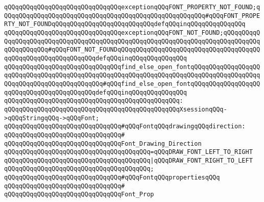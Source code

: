 \verb|qQQqqQQqqQQqqQQqqQQqqQQqqQQqqQQqexceptionqQQqFONT_PROPERTY_NOT_FOUND;qQQqqQQqqQQqqQQqqQQqqQQqqQQqqQQqqQQqqQQqqQQqqQQqqQQqqQQq#qQQqFONT_PROPERTY_NOT_FOUNDqQQqqQQqqQQqqQQqqQQqqQQqqQQqdefqQQqinqQQqqQQqqQQqqQQq|\newline
\verb|qQQqqQQqqQQqqQQqqQQqqQQqqQQqqQQqexceptionqQQqFONT_NOT_FOUND;qQQqqQQqqQQqqQQqqQQqqQQqqQQqqQQqqQQqqQQqqQQqqQQqqQQqqQQqqQQqqQQqqQQqqQQqqQQqqQQqqQQqqQQqqQQq#qQQqFONT_NOT_FOUNDqQQqqQQqqQQqqQQqqQQqqQQqqQQqqQQqqQQqqQQqqQQqqQQqqQQqqQQqqQQqqQQqdefqQQqinqQQqqQQqqQQqqQQq|\newline
\newline
\verb|qQQqqQQqqQQqqQQqqQQqqQQqqQQqqQQqfind_else_open_fontqQQqqQQqqQQqqQQqqQQqqQQqqQQqqQQqqQQqqQQqqQQqqQQqqQQqqQQqqQQqqQQqqQQqqQQqqQQqqQQqqQQqqQQqqQQqqQQqqQQqqQQqqQQqqQQqqQQq#qQQqfind_else_open_fontqQQqqQQqqQQqqQQqqQQqqQQqqQQqqQQqqQQqqQQqqQQqdefqQQqinqQQqqQQqqQQqqQQq|\newline
\verb|qQQqqQQqqQQqqQQqqQQqqQQqqQQqqQQqqQQqqQQqqQQqqQQq:|\newline
\verb|qQQqqQQqqQQqqQQqqQQqqQQqqQQqqQQqqQQqqQQqqQQqqQQqXsessionqQQq->qQQqStringqQQq->qQQqFont;|\newline
\newline
\verb|qQQqqQQqqQQqqQQqqQQqqQQqqQQqqQQq#qQQqFontqQQqdrawingqQQqdirection:|\newline
\verb|qQQqqQQqqQQqqQQqqQQqqQQqqQQqqQQq#|\newline
\verb|qQQqqQQqqQQqqQQqqQQqqQQqqQQqqQQqFont_Drawing_Direction|\newline
\verb|qQQqqQQqqQQqqQQqqQQqqQQqqQQqqQQqqQQqqQQq=qQQqDRAW_FONT_LEFT_TO_RIGHT|\newline
\verb|qQQqqQQqqQQqqQQqqQQqqQQqqQQqqQQqqQQqqQQq|\verb#|qQQqDRAW_FONT_RIGHT_TO_LEFT#\newline
\verb|qQQqqQQqqQQqqQQqqQQqqQQqqQQqqQQqqQQqqQQq;|\newline
\newline
\verb|qQQqqQQqqQQqqQQqqQQqqQQqqQQqqQQq#qQQqFontqQQqpropertiesqQQq|\newline
\verb|qQQqqQQqqQQqqQQqqQQqqQQqqQQqqQQq#|\newline
\verb|qQQqqQQqqQQqqQQqqQQqqQQqqQQqqQQqFont_Prop|\newline
